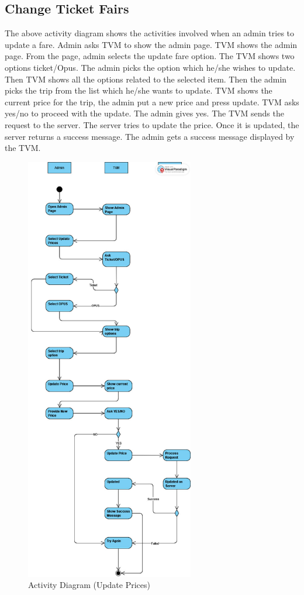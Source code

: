\documentclass{article}
\begin{document}
{\subsection{Change Ticket Fairs}
The above activity diagram shows the activities involved when an admin tries to update a fare. Admin asks TVM to show the admin page. TVM shows the admin page. From the page, admin selects the update fare option. The TVM shows two options ticket/Opus. The admin picks the option which he/she wishes to update. Then TVM shows all the options related to the selected item. Then the admin picks the trip from the list which he/she wants to update. TVM shows the current price for the trip, the admin put a new price and press update. TVM asks yes/no to proceed with the update. The admin gives yes. The TVM sends the request to the server. The server tries to update the price. Once it is updated, the server returns a success message. The admin gets a success message displayed by the TVM.
\begin{figure}[!p]
    \begin{center}
        \includegraphics[width=2.9in]{Activity Diagram (Admin).jpg}
        \caption{Activity Diagram (Update Prices)}
    \end{center}
\end{figure}
\newpage
}
\end{document}
